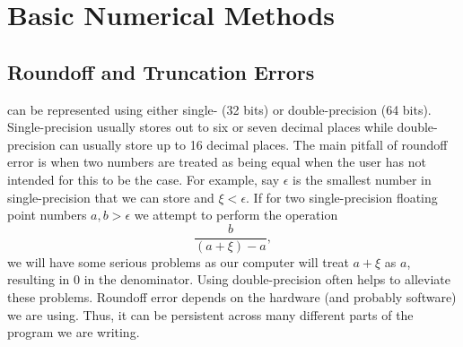 \chapter{Basic Numerical Methods}

\section{Roundoff and Truncation Errors}

 can be represented using either single- (32 bits) or double-precision (64 bits). Single-precision usually stores out to six or seven decimal places while double-precision can usually store up to 16 decimal places. The main pitfall of roundoff error is when two numbers are treated as being equal when the user has not intended for this to be the case. For example, say $\epsilon$ is the smallest number in single-precision that we can store and $\xi<\epsilon$. If for two single-precision floating point numbers $a,b>\epsilon$ we attempt to perform the operation
\begin{equation}
	\frac{b}{(a+\xi)-a},
\end{equation}
we will have some serious problems as our computer will treat $a+\xi$ as $a$, resulting in $0$ in the denominator. Using double-precision often helps to alleviate these problems. Roundoff error depends on the hardware (and probably software) we are using. Thus, it can be persistent across many different parts of the program we are writing.

